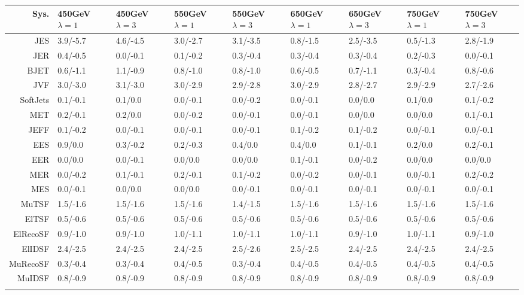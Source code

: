 \begin{tabular}{r|p{.08\linewidth}p{.08\linewidth}p{.08\linewidth}p{.08\linewidth}p{.08\linewidth}p{.08\linewidth}p{.08\linewidth}p{.08\linewidth}}
\toprule
 Sys.  & 450GeV $\lambda=1$  & 450GeV $\lambda=3$  & 550GeV $\lambda=1$  & 550GeV $\lambda=3$  & 650GeV $\lambda=1$  & 650GeV $\lambda=3$  & 750GeV $\lambda=1$  & 750GeV $\lambda=3$  \\
\toprule
JES  & 3.9/-5.7 & 4.6/-4.5 & 3.0/-2.7 & 3.1/-3.5 & 0.8/-1.5 & 2.5/-3.5 & 0.5/-1.3 & 2.8/-1.9 \\
JER  & 0.4/-0.5 & 0.0/-0.1 & 0.1/-0.2 & 0.3/-0.4 & 0.3/-0.4 & 0.3/-0.4 & 0.2/-0.3 & 0.0/-0.1 \\
BJET  & 0.6/-1.1 & 1.1/-0.9 & 0.8/-1.0 & 0.8/-1.0 & 0.6/-0.5 & 0.7/-1.1 & 0.3/-0.4 & 0.8/-0.6 \\
JVF  & 3.0/-3.0 & 3.1/-3.0 & 3.0/-2.9 & 2.9/-2.8 & 3.0/-2.9 & 2.8/-2.7 & 2.9/-2.9 & 2.7/-2.6 \\
SoftJets  & 0.1/-0.1 & 0.1/0.0 & 0.0/-0.1 & 0.0/-0.2 & 0.0/-0.1 & 0.0/0.0 & 0.1/0.0 & 0.1/-0.2 \\
MET  & 0.2/-0.1 & 0.2/0.0 & 0.0/-0.2 & 0.0/-0.1 & 0.0/-0.1 & 0.0/0.0 & 0.0/0.0 & 0.1/-0.1 \\
JEFF  & 0.1/-0.2 & 0.0/-0.1 & 0.0/-0.1 & 0.0/-0.1 & 0.1/-0.2 & 0.1/-0.2 & 0.0/-0.1 & 0.0/-0.1 \\
EES  & 0.9/0.0 & 0.3/-0.2 & 0.2/-0.3 & 0.4/0.0 & 0.4/0.0 & 0.1/-0.1 & 0.2/0.0 & 0.2/-0.1 \\
EER  & 0.0/0.0 & 0.0/-0.1 & 0.0/0.0 & 0.0/0.0 & 0.1/-0.1 & 0.0/-0.2 & 0.0/0.0 & 0.0/0.0 \\
MER  & 0.0/-0.2 & 0.1/-0.1 & 0.2/-0.1 & 0.1/-0.2 & 0.0/-0.2 & 0.0/-0.1 & 0.0/-0.1 & 0.2/-0.2 \\
MES  & 0.0/-0.1 & 0.0/0.0 & 0.0/0.0 & 0.0/-0.1 & 0.0/-0.1 & 0.0/-0.1 & 0.0/-0.1 & 0.0/-0.1 \\
MuTSF  & 1.5/-1.6 & 1.5/-1.6 & 1.5/-1.6 & 1.4/-1.5 & 1.5/-1.6 & 1.5/-1.6 & 1.5/-1.6 & 1.5/-1.6 \\
ElTSF  & 0.5/-0.6 & 0.5/-0.6 & 0.5/-0.6 & 0.5/-0.6 & 0.5/-0.6 & 0.5/-0.6 & 0.5/-0.6 & 0.5/-0.6 \\
ElRecoSF  & 0.9/-1.0 & 0.9/-1.0 & 1.0/-1.1 & 1.0/-1.1 & 1.0/-1.1 & 0.9/-1.0 & 1.0/-1.1 & 0.9/-1.0 \\
ElIDSF  & 2.4/-2.5 & 2.4/-2.5 & 2.4/-2.5 & 2.5/-2.6 & 2.5/-2.5 & 2.4/-2.5 & 2.4/-2.5 & 2.4/-2.5 \\
MuRecoSF  & 0.3/-0.4 & 0.3/-0.4 & 0.4/-0.5 & 0.3/-0.4 & 0.4/-0.5 & 0.4/-0.5 & 0.4/-0.5 & 0.4/-0.5 \\
MuIDSF  & 0.8/-0.9 & 0.8/-0.9 & 0.8/-0.9 & 0.8/-0.9 & 0.8/-0.9 & 0.8/-0.9 & 0.8/-0.9 & 0.8/-0.9 \\
 \\
\bottomrule
\end{tabular}
